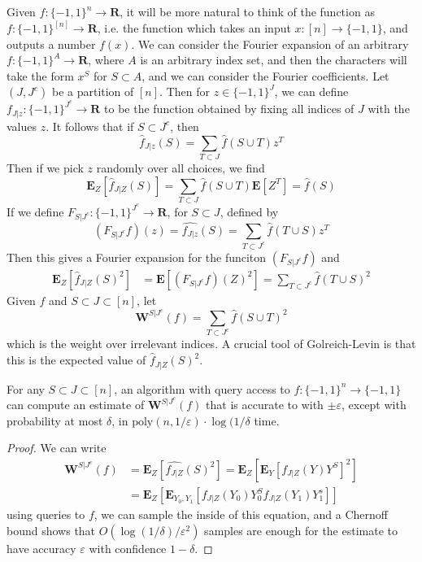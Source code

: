 Given $f: \{ -1, 1 \}^n \to \mathbf{R}$, it will be more natural to think of the function as $f: \{ -1, 1 \}^{[n]} \to \mathbf{R}$, i.e. the function which takes an input $x: [n] \to \{ -1, 1 \}$, and outputs a number $f(x)$. We can consider the Fourier expansion of an arbitrary $f: \{ -1, 1 \}^A \to \mathbf{R}$, where $A$ is an arbitrary index set, and then the characters will take the form $x^S$ for $S \subset A$, and we can consider the Fourier coefficients. Let $(J,J^c)$ be a partition of $[n]$. Then for $z \in \{ -1, 1 \}^J$, we can define $f_{J|z}: \{ -1, 1 \}^{J^c} \to \mathbf{R}$ to be the function obtained by fixing all indices of $J$ with the values $z$. It follows that if $S \subset J^c$, then
%
\[ \widehat{f}_{J|z}(S) = \sum_{T \subset J} \widehat{f}(S \cup T) z^T \]
%
Then if we pick $z$ randomly over all choices, we find
%
\[ \mathbf{E}_Z[\widehat{f}_{J|Z}(S)] = \sum_{T \subset J} \widehat{f}(S \cup T) \mathbf{E}[Z^T] = \widehat{f}(S) \]
%
If we define $F_{S|J^c}: \{ -1, 1 \}^{J^c} \to \mathbf{R}$, for $S \subset J$, defined by
%
\[ (F_{S|J^c} f)(z) = \widehat{f_{J|z}}(S) = \sum_{T \subset J^c} \widehat{f}(T \cup S) z^T \]
%
Then this gives a Fourier expansion for the funciton $(F_{S|J^c} f)$ and
%
\begin{align*}
    \mathbf{E}_Z[\widehat{f}_{J|Z}(S)^2] &= \mathbf{E}[(F_{S|J^c} f)(Z)^2] = \sum_{T \subset J^c} \widehat{f}(T \cup S)^2
\end{align*}
%
Given $f$ and $S \subset J \subset [n]$, let
%
\[ \mathbf{W}^{S|J^c}(f) = \sum_{T \subset J^c} \widehat{f}(S \cup T)^2 \]
%
which is the weight over irrelevant indices. A crucial tool of Golreich-Levin is that this is the expected value of $\widehat{f}_{J|Z}(S)^2$.

\begin{theorem}
    For any $S \subset J \subset [n]$, an algorithm with query access to $f: \{ -1, 1 \}^n \to \{ -1, 1 \}$ can compute an estimate of $\mathbf{W}^{S|J^c}(f)$ that is accurate to with $\pm \varepsilon$, except with probability at most $\delta$, in $\text{poly}(n,1/\varepsilon) \cdot \log(1/\delta$ time.
\end{theorem}
\begin{proof}
    We can write
    \begin{align*}
        \mathbf{W}^{S|J^c}(f) &= \mathbf{E}_Z[\widehat{f_{J|Z}}(S)^2] = \mathbf{E}_Z \left[ \mathbf{E}_Y \left[ f_{J|Z}(Y) Y^S \right]^2 \right]\\
        &= \mathbf{E}_Z \left[ \mathbf{E}_{Y_0,Y_1} \left[ f_{J|Z}(Y_0) Y_0^S f_{J|Z}(Y_1) Y_1^s \right] \right]
    \end{align*}
    using queries to $f$, we can sample the inside of this equation, and a Chernoff bound shows that $O(\log(1/\delta)/\varepsilon^2)$ samples are enough for the estimate to have accuracy $\varepsilon$ with confidence $1-\delta$.
\end{proof}

